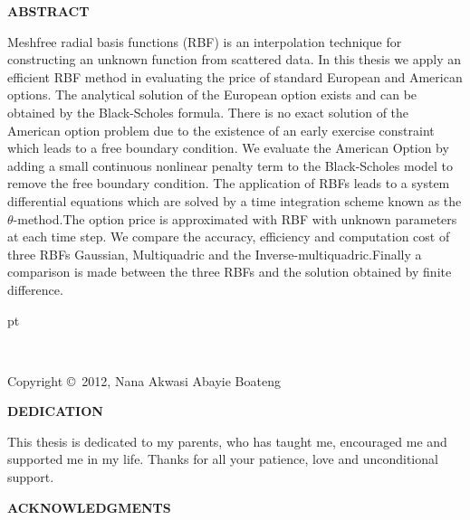 \documentclass[12pt]{article}
\numberwithin{equation}{section} %
\begin{document}
\newpage
\begin{center}
{\bf ABSTRACT}\\
\end{center}
\baselineskip=24pt


Meshfree radial basis functions (RBF) is an interpolation technique
for constructing an unknown function from scattered data. In this
thesis we apply an efficient RBF method in evaluating the price of
standard European and American options. The analytical solution of
the European option exists and can be obtained by the Black-Scholes
formula. There is no exact solution of the American option problem
due to the existence of an early exercise constraint which leads to
a free boundary condition. We evaluate the American Option by adding
a small continuous nonlinear penalty term to the Black-Scholes model
to remove the free boundary condition. The application of RBFs leads
to a system differential equations which are solved by a time
integration scheme known as the $\theta$-method.The option price is
approximated with RBF with unknown parameters at each time step. We
compare the accuracy, efficiency and computation cost of three RBFs
Gaussian, Multiquadric and the Inverse-multiquadric.Finally a
comparison is made between the three RBFs and the solution obtained
by finite difference.


\newpage
{} pt
\begin{center}
\ \ \
\vspace{3.in}

Copyright \copyright\ 2012, Nana Akwasi Abayie Boateng
\end{center}


\newpage

\begin{center}

{ \bf DEDICATION } \\ [.15in]
\end{center}

This thesis is dedicated to my parents, who has taught me,
encouraged me and supported me in my life. Thanks for all your
patience, love and unconditional support.


\newpage
\begin{center}

{ \bf ACKNOWLEDGMENTS} \\ [.15in]
\end{center}
\end{document}
